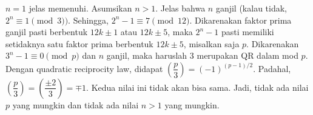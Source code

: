\documentclass[11pt]{scrartcl}
\begin{document}
\begin{problem}
    $n = 1$ jelas memenuhi. Asumsikan $n > 1$. Jelas bahwa $n$ ganjil (kalau tidak, $2^n \equiv 1 \pmod{3})$. Sehingga, $2^n - 1 \equiv 7 \pmod{12}$. Dikarenakan faktor prima ganjil pasti berbentuk $12k \pm 1$ atau $12k \pm 5$, maka $2^n - 1$ pasti memiliki setidaknya satu faktor prima berbentuk $12k \pm 5$, misalkan saja $p$. Dikarenakan $3^n - 1 \equiv 0 \pmod{p}$ dan $n$ ganjil, maka haruslah $3$ merupakan QR dalam mod $p$. Dengan quadratic reciprocity law, didapat $\left(\dfrac{p}{3}\right) = (-1)^{(p - 1)/2}$. Padahal, $\left(\dfrac{p}{3}\right) = \left(\dfrac{\pm 2}{3}\right) = \mp 1$. Kedua nilai ini tidak akan bisa sama. Jadi, tidak ada nilai $p$ yang mungkin dan tidak ada nilai $n > 1$ yang mungkin.
\end{problem}

\begin{problem}
    
\end{problem}
\end{document}
